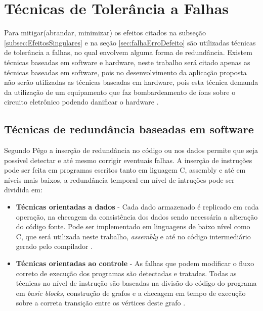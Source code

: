 \section{Técnicas de Tolerância a Falhas}\label{sec:tecnica}


Para mitigar(abrandar, minimizar) os efeitos citados na subseção \ref{subsec:EfeitosSingulares} e na seção \ref{sec:falhaErroDefeito} são utilizadas técnicas de tolerância a falhas, no qual envolvem alguma forma de redundância.  
Existem técnicas baseadas em software e hardware, neste trabalho será citado apenas as técnicas baseadas em software, pois no desenvolvimento da aplicação proposta não serão utilizadas as técnicas baseadas em hardware, pois esta técnica demanda da utilização de um equipamento que faz bombardeamento de íons sobre o circuito eletrônico podendo danificar o hardware \cite{Weber:2002}.

\subsection{Técnicas de redundância baseadas em software}

Segundo Pêgo \cite{Pego:2014} a inserção de redundância no código ou nos dados permite que seja possível detectar e até mesmo corrigir eventuais falhas. A inserção de instruções pode ser feita em programas escritos tanto em liguagem C, assembly e até em níveis mais baixos, a redundância temporal em nível de intruções pode ser dividida em:


\begin{itemize}
	\item \textbf{Técnicas orientadas a dados} - Cada dado armazenado é replicado em cada operação, na checagem da consistência dos dados sendo necessária a alteração do código fonte. Pode ser implementado em linguagens de baixo nível como C, que será utilizada neste trabalho, \textit{assembly} e até no código intermediário gerado pelo compilador \cite{Pego:2014}.
	
	\item \textbf{Técnicas orientadas ao controle} - As falhas que podem modificar o fluxo correto de execução dos programas são detectadas e tratadas. Todas as técnicas no nível de instrução são baseadas na divisão do código do programa em \textit{basic blocks}, construção de grafos e a checagem em tempo de execução sobre a correta transição entre os vértices deste grafo \cite{Pego:2014}.  		 
	
\end{itemize}


